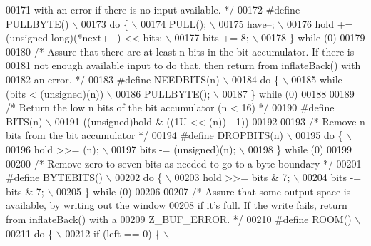 \begin{DoxyCode}
00171 \textcolor{comment}{   with an error if there is no input available. */}
00172 \textcolor{preprocessor}{#define PULLBYTE() \(\backslash\)}
00173 \textcolor{preprocessor}{    do \{ \(\backslash\)}
00174 \textcolor{preprocessor}{        PULL(); \(\backslash\)}
00175 \textcolor{preprocessor}{        have--; \(\backslash\)}
00176 \textcolor{preprocessor}{        hold += (unsigned long)(*next++) << bits; \(\backslash\)}
00177 \textcolor{preprocessor}{        bits += 8; \(\backslash\)}
00178 \textcolor{preprocessor}{    \} while (0)}
00179 
00180 \textcolor{comment}{/* Assure that there are at least n bits in the bit accumulator.  If there is}
00181 \textcolor{comment}{   not enough available input to do that, then return from inflateBack() with}
00182 \textcolor{comment}{   an error. */}
00183 \textcolor{preprocessor}{#define NEEDBITS(n) \(\backslash\)}
00184 \textcolor{preprocessor}{    do \{ \(\backslash\)}
00185 \textcolor{preprocessor}{        while (bits < (unsigned)(n)) \(\backslash\)}
00186 \textcolor{preprocessor}{            PULLBYTE(); \(\backslash\)}
00187 \textcolor{preprocessor}{    \} while (0)}
00188 
00189 \textcolor{comment}{/* Return the low n bits of the bit accumulator (n < 16) */}
00190 \textcolor{preprocessor}{#define BITS(n) \(\backslash\)}
00191 \textcolor{preprocessor}{    ((unsigned)hold & ((1U << (n)) - 1))}
00192 
00193 \textcolor{comment}{/* Remove n bits from the bit accumulator */}
00194 \textcolor{preprocessor}{#define DROPBITS(n) \(\backslash\)}
00195 \textcolor{preprocessor}{    do \{ \(\backslash\)}
00196 \textcolor{preprocessor}{        hold >>= (n); \(\backslash\)}
00197 \textcolor{preprocessor}{        bits -= (unsigned)(n); \(\backslash\)}
00198 \textcolor{preprocessor}{    \} while (0)}
00199 
00200 \textcolor{comment}{/* Remove zero to seven bits as needed to go to a byte boundary */}
00201 \textcolor{preprocessor}{#define BYTEBITS() \(\backslash\)}
00202 \textcolor{preprocessor}{    do \{ \(\backslash\)}
00203 \textcolor{preprocessor}{        hold >>= bits & 7; \(\backslash\)}
00204 \textcolor{preprocessor}{        bits -= bits & 7; \(\backslash\)}
00205 \textcolor{preprocessor}{    \} while (0)}
00206 
00207 \textcolor{comment}{/* Assure that some output space is available, by writing out the window}
00208 \textcolor{comment}{   if it's full.  If the write fails, return from inflateBack() with a}
00209 \textcolor{comment}{   Z\_BUF\_ERROR. */}
00210 \textcolor{preprocessor}{#define ROOM() \(\backslash\)}
00211 \textcolor{preprocessor}{    do \{ \(\backslash\)}
00212 \textcolor{preprocessor}{        if (left == 0) \{ \(\backslash\)}

\end{DoxyCode}
